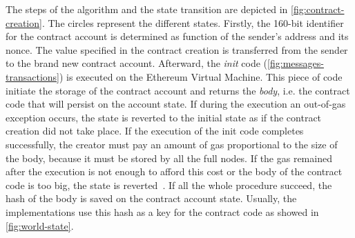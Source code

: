 The steps of the algorithm and the state transition are depicted in
\autoref{fig:contract-creation}. The circles represent the different states.
Firstly, the 160-bit identifier for the contract account is determined as
function of the sender's address and its nonce. The value specified in the
contract creation is transferred from the sender to the brand new contract
account. Afterward, the \emph{init} code (\autoref{fig:messages-transactions})
is executed on the Ethereum Virtual Machine. This  piece of code initiate the
storage of the contract account and returns the \emph{body}, i.e. the contract
code that will persist on the account state. If during the execution an
out-of-gas exception occurs, the state is reverted to the initial state as if
the contract creation did not take place. If the execution of the init code
completes successfully, the creator must pay an amount of gas proportional to
the size of the body, because it must be stored by all the full nodes. If the
gas remained after the execution is not enough to afford this cost or the body
of the contract code is too big, the state is reverted~\cite{wood2018ethereum}.
If all the whole procedure succeed, the hash of the body is saved on the
contract account state. Usually, the implementations use this hash as a key for
the contract code as showed in \autoref{fig:world-state}.
